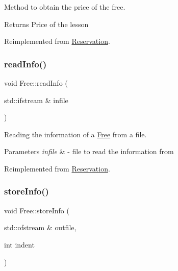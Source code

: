 Method to obtain the price of the free. 

\begin{DoxyReturn}{Returns}
Price of the lesson 
\end{DoxyReturn}


Reimplemented from \mbox{\hyperlink{class_reservation_a62cdb2f1a24e2fce92fb9f024ae9f494}{Reservation}}.

\mbox{\label{class_free_ad1023c825c9790edf0797e2e69dd2fcf}} 
\subsubsection{\texorpdfstring{read\+Info()}{readInfo()}}
{\footnotesize\ttfamily void Free\+::read\+Info (\begin{DoxyParamCaption}\item[{std\+::ifstream \&}]{infile }\end{DoxyParamCaption})\hspace{0.3cm}{\ttfamily [virtual]}}



Reading the information of a \mbox{\hyperlink{class_free}{Free}} from a file. 


\begin{DoxyParams}{Parameters}
{\em infile} & -\/ file to read the information from \\
\hline
\end{DoxyParams}


Reimplemented from \mbox{\hyperlink{class_reservation_acff32024a350c2156af9f74522c59b7b}{Reservation}}.

\mbox{\label{class_free_a5eec9da16ebf4f388d16dd270bd93b64}} 
\subsubsection{\texorpdfstring{store\+Info()}{storeInfo()}}
{\footnotesize\ttfamily void Free\+::store\+Info (\begin{DoxyParamCaption}\item[{std\+::ofstream \&}]{outfile,  }\item[{int}]{indent }\end{DoxyParamCaption})\hspace{0.3cm}{\ttfamily [virtual]}}



